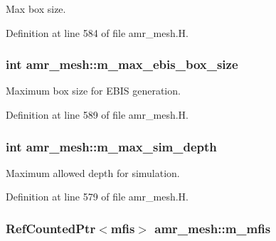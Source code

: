 Max box size. 



Definition at line 584 of file amr\+\_\+mesh.\+H.

\subsubsection[{\texorpdfstring{m\+\_\+max\+\_\+ebis\+\_\+box\+\_\+size}{m_max_ebis_box_size}}]{\setlength{\rightskip}{0pt plus 5cm}int amr\+\_\+mesh\+::m\+\_\+max\+\_\+ebis\+\_\+box\+\_\+size\hspace{0.3cm}{\ttfamily [protected]}}\hypertarget{classamr__mesh_a250a2cb3d46e1870223f28532c1584ac}{}\label{classamr__mesh_a250a2cb3d46e1870223f28532c1584ac}


Maximum box size for E\+B\+IS generation. 



Definition at line 589 of file amr\+\_\+mesh.\+H.

\subsubsection[{\texorpdfstring{m\+\_\+max\+\_\+sim\+\_\+depth}{m_max_sim_depth}}]{\setlength{\rightskip}{0pt plus 5cm}int amr\+\_\+mesh\+::m\+\_\+max\+\_\+sim\+\_\+depth\hspace{0.3cm}{\ttfamily [protected]}}\hypertarget{classamr__mesh_a325befd987163bba8a6ad9e87ae5e6a8}{}\label{classamr__mesh_a325befd987163bba8a6ad9e87ae5e6a8}


Maximum allowed depth for simulation. 



Definition at line 579 of file amr\+\_\+mesh.\+H.

\subsubsection[{\texorpdfstring{m\+\_\+mfis}{m_mfis}}]{\setlength{\rightskip}{0pt plus 5cm}Ref\+Counted\+Ptr$<${\bf mfis}$>$ amr\+\_\+mesh\+::m\+\_\+mfis\hspace{0.3cm}{\ttfamily [protected]}}\hypertarget{classamr__mesh_aff98cae1e8b881da102b39f277f32005}{}\label{classamr__mesh_aff98cae1e8b881da102b39f277f32005}



